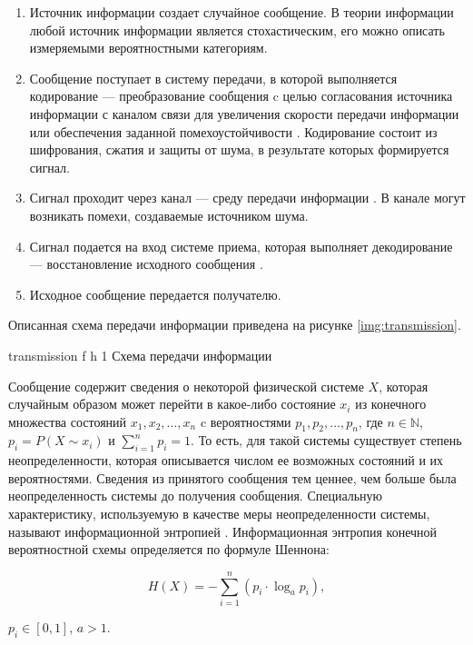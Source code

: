 \begin{enumerate}
	\item Источник информации создает случайное сообщение. В теории информации любой источник информации является стохастическим, его можно описать измеряемыми вероятностными категориям.
	\item Сообщение поступает в систему передачи, в которой выполняется кодирование --- преобразование сообщения c целью согласования источника информации с каналом связи для увеличения скорости передачи информации или обеспечения заданной помехоустойчивости  \cite{information}. Кодирование состоит из шифрования, сжатия и защиты от шума, в результате которых формируется сигнал. 
	\item Сигнал проходит через канал --- среду передачи информации \cite{transmission}. В канале могут возникать помехи, создаваемые источником шума.
	\item Сигнал подается на вход системе приема, которая выполняет декодирование --- восстановление исходного сообщения \cite{information}.
	\item Исходное сообщение передается получателю.
\end{enumerate}

Описанная схема передачи информации приведена на рисунке \ref{img:transmission}.

    {transmission}
    {f}
    {h}
    {1\textwidth}
    {Схема передачи информации}
    
Сообщение содержит сведения о некоторой физической системе $X$, которая случайным образом может перейти в какое-либо состояние $x_{i}$ из конечного множества состояний $x_{1}, x_{2}, \dots, x_{n}$ c вероятностями $p_{1}, p_{2}, \dots, p_{n}$, где $n \in \mathbb{N}$, $p_{i} = P(X \sim x_{i})$ и $\sum_{i = 1}^n p_{i} = 1$. То есть, для такой системы существует степень неопределенности, которая описывается числом ее возможных состояний и их вероятностями. Сведения из принятого сообщения тем ценнее, чем больше была неопределенность системы до получения сообщения. Специальную характеристику, используемую в качестве меры неопределенности системы, называют информационной энтропией \cite{definition}. Информационная энтропия конечной вероятностной схемы определяется по формуле Шеннона:

\begin{equation}\label{entropy}
	H(X) = -\sum_{i = 1}^n (p_{i} \cdot \log_{a}p_{i}),
\end{equation}

 $p_{i} \in [0, 1]$, $a > 1$.

